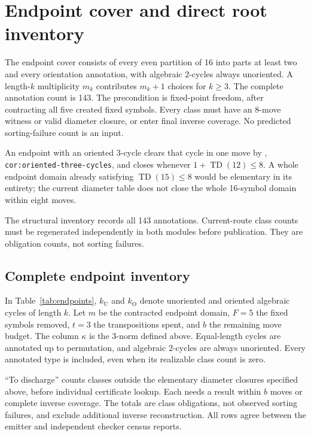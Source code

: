 \documentclass[11pt,a4paper]{article}
\newcommand{\TD}{\operatorname{TD}}
\begin{document}
\section{Endpoint cover and direct root inventory}
The endpoint cover consists of every even partition of 16 into parts at
least two and every orientation annotation, with algebraic $2$-cycles always
unoriented. A length-$k$ multiplicity $m_k$ contributes $m_k+1$ choices for
$k\geq3$. The complete annotation count is 143. The precondition is fixed-point
freedom, after contracting all five created fixed symbols. Every class must
have an 8-move witness or valid diameter closure, or enter final inverse
coverage. No predicted sorting-failure count is an input.

An endpoint with an oriented $3$-cycle clears that cycle in one move by
\cite{framework}, \nolinkurl{cor:oriented-three-cycles}, and closes whenever
$1+\TD(12)\leq 8$. A whole endpoint domain already satisfying
$\TD(15)\leq 8$ would be elementary in its entirety; the current diameter table does not close the whole 16-symbol domain within eight moves.

The structural inventory records all 143 annotations. Current-route class counts
must be regenerated independently in both modules before publication. They are
obligation counts, not sorting failures.

\subsection{Complete endpoint inventory}
In Table~\ref{tab:endpoints}, $k_{\mathrm U}$ and $k_{\mathrm O}$ denote
unoriented and oriented algebraic cycles of length $k$. Let $m$ be the
contracted endpoint domain, $F=5$ the fixed symbols removed, $t=3$ the
transpositions spent, and $b$ the remaining move budget. The column $\kappa$
is the $3$-norm defined above. Equal-length cycles are annotated up to
permutation, and algebraic $2$-cycles are always unoriented. Every annotated
type is included, even when its realizable class count is zero.

``To discharge'' counts classes outside the elementary diameter closures
specified above, before individual certificate lookup. Each needs a result
within $b$ moves or complete inverse coverage. The totals are class obligations,
not observed sorting failures, and exclude additional inverse reconstruction.
All rows agree between the emitter and independent checker census reports.
\end{document}
